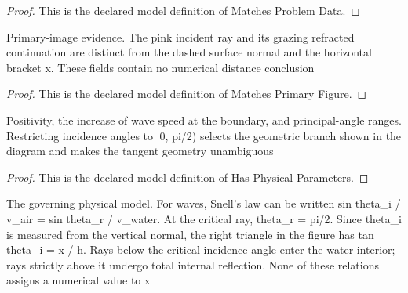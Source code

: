 \begin{proof}
  This is the declared model definition of Matches Problem Data.
\end{proof}
\begin{definition}
  \label{def:physics:phyx-mini-0209:phyxminiproblems-problemphyxmini0209-matchesprimaryfigure}
  Primary-image evidence. The pink incident ray and its grazing refracted continuation are distinct from the dashed surface normal and the horizontal bracket x. These fields contain no numerical distance conclusion
\end{definition}
\begin{proof}
  This is the declared model definition of Matches Primary Figure.
\end{proof}
\begin{definition}
  \label{def:physics:phyx-mini-0209:phyxminiproblems-problemphyxmini0209-hasphysicalparameters}
  Positivity, the increase of wave speed at the boundary, and principal-angle ranges. Restricting incidence angles to [0, pi/2) selects the geometric branch shown in the diagram and makes the tangent geometry unambiguous
\end{definition}
\begin{proof}
  This is the declared model definition of Has Physical Parameters.
\end{proof}
\begin{definition}
  \label{def:physics:phyx-mini-0209:phyxminiproblems-problemphyxmini0209-satisfiescriticalacousticrefractionphysics}
  The governing physical model. For waves, Snell's law can be written sin theta\_i / v\_air = sin theta\_r / v\_water. At the critical ray, theta\_r = pi/2. Since theta\_i is measured from the vertical normal, the right triangle in the figure has tan theta\_i = x / h. Rays below the critical incidence angle enter the water interior; rays strictly above it undergo total internal reflection. None of these relations assigns a numerical value to x
\end{definition}
